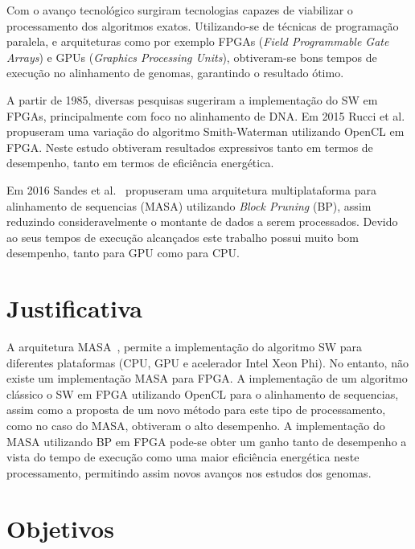 \documentclass[12pt, a4paper]{article}
\numberwithin{table}{section}
\begin{document}
Com o avanço tecnológico surgiram tecnologias capazes de viabilizar o processamento
dos algoritmos exatos. Utilizando-se de técnicas de programação paralela, e 
arquiteturas como por exemplo FPGAs (\textit{Field Programmable Gate Arrays}) e GPUs 
(\textit{Graphics Processing Units}), obtiveram-se bons tempos de execução no alinhamento
de genomas, garantindo o resultado ótimo. 

A partir de 1985, diversas pesquisas sugeriram a implementação do SW em FPGAs,
principalmente com foco no alinhamento de DNA. 
Em 2015 Rucci et al.~\cite{7345650} propuseram uma variação do algoritmo
Smith-Waterman utilizando OpenCL em FPGA.
Neste estudo obtiveram resultados expressivos tanto em termos de desempenho, 
tanto em termos de eficiência energética. 

Em 2016 Sandes et al.~\cite{DeO.Sandes:2016:MMA:2888415.2858656} propuseram
uma arquitetura multiplataforma para
alinhamento de sequencias (MASA) utilizando \textit{Block Pruning} (BP),
assim reduzindo consideravelmente o montante de dados a serem processados. 
Devido ao seus tempos de execução alcançados este trabalho possui muito bom
desempenho, tanto para GPU como para CPU.

\section{Justificativa}
\label{sec:justificativa}

A arquitetura MASA~\cite{DeO.Sandes:2016:MMA:2888415.2858656}, permite a 
implementação do algoritmo SW para diferentes plataformas (CPU, GPU e acelerador 
Intel Xeon Phi). No entanto, não existe um implementação MASA para FPGA.
A implementação de um algoritmo clássico o SW em FPGA utilizando OpenCL para o 
alinhamento de sequencias, assim como a proposta de um novo método para este
tipo de processamento, como no caso do MASA, obtiveram o alto desempenho. 
A implementação do MASA utilizando BP em FPGA pode-se obter um ganho tanto 
de desempenho a vista do tempo de execução como uma maior eficiência energética
neste processamento, permitindo assim novos avanços nos estudos dos genomas.


\section{Objetivos}
\label{sec:objetivos}
\end{document}
